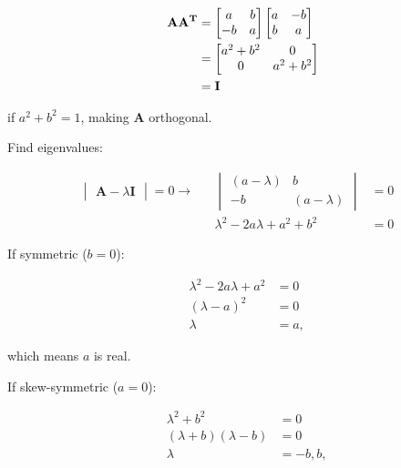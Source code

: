 \documentclass{article}
\begin{document}
\begin{align}
    \label{eq:3}
    && \textbf{AA\textsuperscript{T}} &= \begin{bmatrix} 
    a & b\\
    -b & a
    \end{bmatrix} \begin{bmatrix} 
    a & -b\\
    b & a
    \end{bmatrix}
    \\
    \label{eq:4}
    && &= \begin{bmatrix}
    a^2+b^2 & 0\\
    0 & a^2+b^2
    \end{bmatrix}
    \\
    \label{eq:5}
    && &= \textbf{I}
\end{align}

if $a^2+b^2=1$, making \textbf{A} orthogonal.

Find eigenvalues:

\begin{align}
    \label{eq:6}
    \begin{vmatrix}
    \textbf{A}-\lambda\textbf{I}
    \end{vmatrix} = 0 \rightarrow && \begin{vmatrix}
    (a-\lambda) & b\\
    -b & (a-\lambda)
    \end{vmatrix} &= 0
    \\
    \label{eq:7}
    && \lambda ^2 -2a \lambda +a^2 + b^2 &= 0
\end{align}

If symmetric ($b=0$):

\begin{align}
    \label{eq:8}
    && \lambda^2-2a\lambda+a^2 &= 0
    \\
    \label{eq:9}
    && (\lambda-a)^2&=0
    \\
    \label{eq:10}
    && \lambda &= a,
\end{align}

which means $a$ is real.

If skew-symmetric ($a=0$):

\begin{align}
    \label{eq:11}
    && \lambda^2 + b^2 &= 0
    \\
    \label{eq:12}
    && (\lambda + b)(\lambda - b) &= 0
    \\
    \label{eq:13}
    && \lambda &= -b, b,
\end{align}
\end{document}

